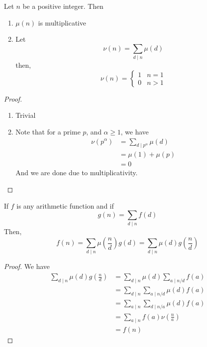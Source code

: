 \begin{theorem}
    Let $n$ be a positive integer. Then 
    \begin{enumerate}
        \item $\mu(n)$ is multiplicative
        \item Let 
        \begin{equation*}
            \nu(n) = \sum_{d\mid n}\mu(d)
        \end{equation*}
        then, 
        \begin{equation*}
            \nu(n) = 
            \begin{cases}
                1 & n = 1\\
                0 & n > 1
            \end{cases}
        \end{equation*}
    \end{enumerate}
\end{theorem}
\begin{proof}
    \hfill
    \begin{enumerate}
        \item Trivial 
        \item Note that for a prime $p$, and $\alpha \ge 1$, we have 
        \begin{align*}
            \nu(p^\alpha) &= \sum_{d\mid p^\alpha}\mu(d)\\
            &= \mu(1) + \mu(p)\\
            &= 0
        \end{align*}
        And we are done due to multiplicativity.
    \end{enumerate}
\end{proof}

\begin{theorem}
    If $f$ is any arithmetic function and if 
    \begin{equation*}
        g(n) = \sum_{d\mid n}f(d)
    \end{equation*}
    Then, 
    \begin{equation*}
        f(n) = \sum_{d\mid n}\mu\left(\frac{n}{d}\right)g(d) = \sum_{d\mid n}\mu(d)g\left(\frac{n}{d}\right)
    \end{equation*}
\end{theorem}
\begin{proof}
    We have 
    \begin{align*}
        \sum_{d\mid n}\mu(d)g\left(\frac{n}{d}\right) &= \sum_{d\mid n}\mu(d)\sum_{a\mid n/d}f(a)\\
        &= \sum_{d\mid n}\sum_{a\mid n/d}\mu(d)f(a)\\
        &= \sum_{a\mid n}\sum_{d\mid n/a}\mu(d)f(a)\\
        &= \sum_{a\mid n}f(a)\nu\left(\frac{n}{a}\right)\\
        &= f(n)
    \end{align*}
\end{proof}

